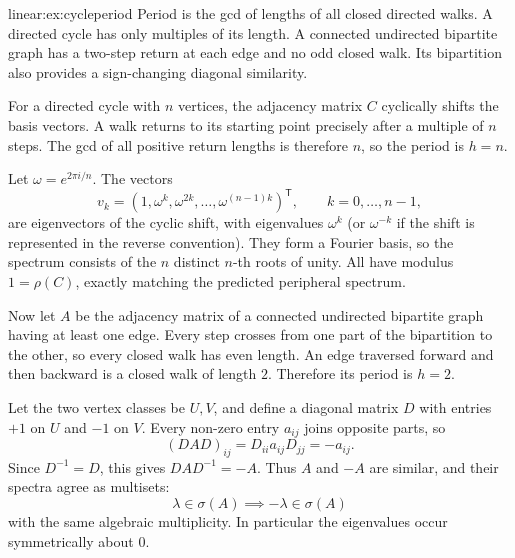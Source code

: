 \begin{solution}{linear:ex:cycleperiod}
\idea Period is the gcd of lengths of all closed directed walks. A directed cycle has only multiples of its length. A connected undirected bipartite graph has a two-step return at each edge and no odd closed walk. Its bipartition also provides a sign-changing diagonal similarity.

\writeup For a directed cycle with $n$ vertices, the adjacency matrix $C$ cyclically shifts the basis vectors. A walk returns to its starting point precisely after a multiple of $n$ steps. The gcd of all positive return lengths is therefore $n$, so the period is $h=n$.

Let $\omega=e^{2\pi i/n}$. The vectors
\[
v_k=(1,\omega^k,\omega^{2k},\ldots,\omega^{(n-1)k})^{\mathsf T},
\qquad k=0,\ldots,n-1,
\]
are eigenvectors of the cyclic shift, with eigenvalues $\omega^k$ (or $\omega^{-k}$ if the shift is represented in the reverse convention). They form a Fourier basis, so the spectrum consists of the $n$ distinct $n$-th roots of unity. All have modulus $1=\rho(C)$, exactly matching the predicted peripheral spectrum.

Now let $A$ be the adjacency matrix of a connected undirected bipartite graph having at least one edge. Every step crosses from one part of the bipartition to the other, so every closed walk has even length. An edge traversed forward and then backward is a closed walk of length $2$. Therefore its period is $h=2$.

Let the two vertex classes be $U,V$, and define a diagonal matrix $D$ with entries $+1$ on $U$ and $-1$ on $V$. Every non-zero entry $a_{ij}$ joins opposite parts, so
\[
(DAD)_{ij}=D_{ii}a_{ij}D_{jj}=-a_{ij}.
\]
Since $D^{-1}=D$, this gives $DAD^{-1}=-A$. Thus $A$ and $-A$ are similar, and their spectra agree as multisets:
\[
\boxed{\lambda\in\sigma(A)\implies-\lambda\in\sigma(A)}
\]
with the same algebraic multiplicity. In particular the eigenvalues occur symmetrically about $0$.


\end{solution}
